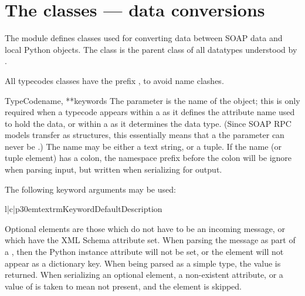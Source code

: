 \chapter{The  classes --- data conversions}

The  module defines classes used for converting data
between SOAP data and local Python objects.
The  class is the parent class of all datatypes
understood by \ZSI{}.

All typecodes classes have the prefix , to avoid name clashes.

\begin{classdesc}{TypeCode}{name, **keywords}
The  parameter is the name of the object; this is only
required when a typecode appears within a  as it defines
the attribute name used to hold the data, or within a 
as it determines the data type.
(Since SOAP RPC models transfer as structures, this essentially means that
a the  parameter can never be .)
The name may be either a text string, or a  tuple.
If the name (or  tuple element) has a colon, the namespace
prefix before the colon will be ignore when parsing input, but written
when serializing for output.

The following keyword arguments may be used:

\begin{tableiii}{l|c|p{30em}}{textrm}{Keyword}{Default}{Description}
\end{tableiii}

Optional elements are those which do not have to be an incoming
message, or which have the XML Schema  attribute set.
When parsing the message as part of a , then the Python
instance attribute will not be set, or the element will not appear as
a dictionary key.
When being parsed as a simple type, the value  is returned.
When serializing an optional element, a non-existent attribute, or a value
of  is taken to mean not present, and the element is skipped.

\end{classdesc}

